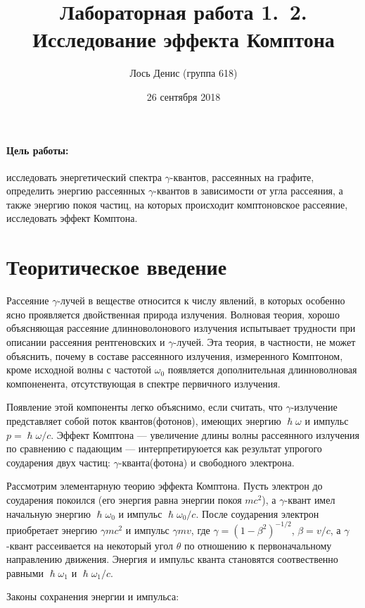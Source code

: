 \documentclass[12pt]{article}
\title{{\bf Лабораторная работа 1.\, 2. \\ Исследование эффекта Комптона}}
\author{Лось Денис (группа 618)}
\date{26 сентября 2018}
\begin{document}
\maketitle

\paragraph{Цель работы: } исследовать энергетический спектра $\gamma$-квантов, рассеянных на графите, определить энергию рассеянных $\gamma$-квантов в зависимости от угла рассеяния, а также энергию покоя частиц, на которых происходит комптоновское рассеяние, исследовать эффект Комптона.

\section*{Теоритическое введение}
\par
	Рассеяние $\gamma$-лучей в веществе относится к числу явлений, в которых особенно ясно проявляется двойственная природа излучения. Волновая теория, хорошо объясняющая рассеяние длинноволонового излучения испытывает трудности при описании рассеяния рентгеновских и $\gamma$-лучей. Эта теория, в частности, не может объяснить, почему в составе рассеянного излучения, измеренного Комптоном, кроме исходной волны с частотой $\omega_0$ появляется дополнительная длинноволновая компоненента, отсутствующая в спектре первичного излучения.
\par
	Появление этой компоненты легко объяснимо, если считать, что $\gamma$-излучение представляет собой поток квантов(фотонов), имеющих энергию $\hslash \omega$ и импульс $p = \hslash \omega / c$. Эффект Комптона --- увеличение длины волны рассеянного излучения по сравнению с падающим --- интерпретируюется как результат упрогого соударения двух частиц: $\gamma$-кванта(фотона) и свободного электрона.
\par
	Рассмотрим элементарную теорию эффекта Комптона. Пусть электрон до соударения покоился (его энергия равна энергии покоя $mc^2$), а $\gamma$-квант имел начальную энергию $\hslash \omega_0$ и импульс $\hslash \omega_0 / c$. После соударения электрон приобретает энергию $\gamma mc^2$ и импульс $\gamma m v$, где $\gamma = (1 - \beta^2)^{-1/2}$, $\beta = v / c$, а $\gamma$-квант рассеивается на некоторый угол $\theta$ по отношению к первоначальному направлению движения. Энергия и импульс кванта становятся соотвественно равными $\hslash \omega_1$ и $\hslash \omega_1 / c$.
\par
	Законы сохранения энергии и импульса:
\end{document}
